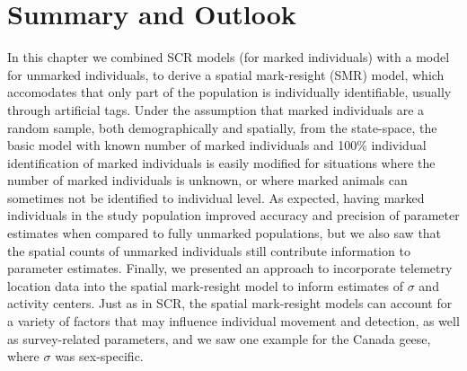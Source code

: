 \section{Summary and Outlook}

In this chapter we combined SCR models (for marked individuals) with a
model for unmarked individuals, 
to derive a spatial mark-resight (SMR) model, which
accomodates that only part of the population is individually identifiable,
usually through artificial tags. Under the assumption that marked
individuals are a random sample, both demographically and spatially,
from the state-space, the basic model with known number of marked
individuals and
 100\% individual identification of marked individuals is easily
modified for situations where the number of marked individuals is
unknown, or where marked animals can sometimes not be identified to
individual level. As expected, having marked individuals in the study
population improved accuracy and precision of parameter estimates when
compared to fully unmarked populations, but we also saw that the
spatial counts of unmarked individuals still contribute information to
parameter estimates. Finally, we presented an approach to
incorporate telemetry location data into the spatial mark-resight
model to inform estimates of $\sigma$ and activity centers. Just as in
SCR, the spatial mark-resight models can account for a variety of
factors that may influence individual movement and detection, as well
as survey-related parameters, and we saw one example for the Canada
geese, where $\sigma$ was sex-specific.

